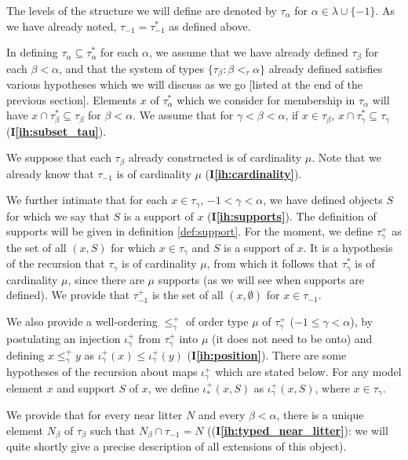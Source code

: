 \documentclass[112pt]{article}
\theoremstyle{definition}
\theoremstyle{remark}
\newcommand{\ihref}[1]{(\textbf{I\ref{#1}})}
\begin{document}
The levels of the structure we will define are denoted by $\tau_\alpha$ for \newline $\alpha \in \lambda \cup \{-1\}$.  As we have already noted, $\tau_{-1}=\tau^*_{-1}$ as defined above.

In defining $\tau_\alpha \subseteq \tau^*_\alpha$ for each $\alpha$, we assume that we have already defined $\tau_\beta$ for each $\beta<\alpha$, and that the system of types $\{\tau_\beta:\beta <_\tau \alpha\}$ already defined satisfies various hypotheses which we will discuss as we go [listed at the end of the previous section].
Elements $x$ of $\tau^*_\alpha$ which we consider for membership in $\tau_\alpha$ will have $x \cap \tau^*_\beta \subseteq \tau_\beta$ for $\beta<\alpha$.  We assume that for $\gamma<\beta<\alpha$, if $x \in \tau_\beta$, $x \cap \tau^*_\gamma \subseteq \tau_\gamma$ \ihref{ih:subset_tau}.

We suppose that each $\tau_\beta$ already constructed is of cardinality $\mu$.  Note that we already know that
$\tau_{-1}$ is of cardinality $\mu$ \ihref{ih:cardinality}.


We further intimate that for each $x \in \tau_\gamma$, $-1<\gamma<\alpha$, we have defined objects $S$ for which we say that $S$ is a support of $x$ \ihref{ih:supports}.  The definition of supports will be given in definition \ref{def:support}.  For the moment, we define $\tau_\gamma^+$ as the set of all $(x,S)$ for which $x \in \tau_\gamma$ and $S$ is a support of $x$.  It is a hypothesis of the recursion
that $\tau_\gamma$ is of cardinality $\mu$, from which it follows that  $\tau^*_\gamma$ is of cardinality $\mu$, since there are $\mu$ supports (as we will see when supports are defined). We provide that $\tau_{-1}^+$ is the set
of all $(x,\emptyset)$ for $x \in \tau_{-1}$.

We also provide a well-ordering $\leq^+_\gamma$ of order type $\mu$ of $\tau_\gamma^+$ ($-1 \leq \gamma <\alpha$), by postulating an injection $\iota^+_\gamma$ from $\tau_\gamma^+$ into $\mu$ (it does not need to be onto) and defining $x \leq^+_\gamma y$ as $\iota^+_\gamma(x) \leq \iota^+_\gamma(y)$ \ihref{ih:position}.   There are some hypotheses of the recursion about maps $\iota^+_\gamma$ which are stated below.   For any model element $x$ and support $S$ of $x$, we define $\iota^+_*(x,S)$ as $\iota^+_\gamma(x,S)$, where $x \in \tau_\gamma$.


We provide that for every near litter $N$ and every $\beta<\alpha$, there is a unique element $N_\beta$ of $\tau_\beta$ such that $N_\beta \cap \tau_{-1}=N$ (\ihref{ih:typed_near_litter}:  we will quite shortly give a precise description of all extensions of this object).
\end{document}
